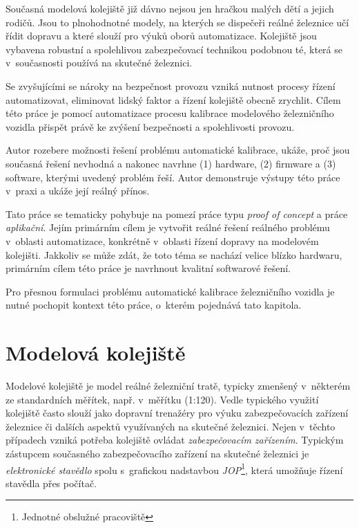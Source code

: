 Současná modelová kolejiště již dávno nejsou jen hračkou malých dětí
a jejich rodičů. Jsou to plnohodnotné modely, na kterých se dispečeři reálné
železnice učí řídit dopravu a které slouží pro výuků oborů automatizace.
Kolejiště jsou vybavena robustní a spolehlivou zabezpečovací technikou
podobnou té, která se v~současnosti používá na skutečné železnici.

Se zvyšujícími se nároky na bezpečnost provozu vzniká nutnost procesy řízení
automatizovat, eliminovat lidský faktor a řízení kolejiště obecně
zrychlit. Cílem této práce je pomocí automatizace procesu kalibrace modelového
železničního vozidla přispět právě ke zvýšení bezpečnosti a spolehlivosti
provozu.

Autor rozebere možnosti řešení problému automatické kalibrace, ukáže, proč jsou
současná řešení nevhodná a nakonec navrhne (1) hardware, (2) firmware a (3)
software, kterými uvedený problém řeší. Autor demonstruje výstupy této práce
v~praxi a ukáže její reálný přínos.

Tato práce se tematicky pohybuje na pomezí práce typu \textit{proof of concept}
a práce \textit{aplikační}. Jejím primárním cílem je vytvořit reálné řešení
reálného problému v~oblasti automatizace, konkrétně v~oblasti řízení dopravy na
modelovém kolejišti. Jakkoliv se může zdát, že toto téma se nachází velice
blízko hardwaru, primárním cílem této práce je navrhnout kvalitní softwarové
řešení.

Pro přesnou formulaci problému automatické kalibrace železničního vozidla je
nutné pochopit kontext této práce, o~kterém pojednává tato kapitola.

\section{Modelová kolejiště}

Modelové kolejiště je model reálné železniční tratě, typicky zmenšený
v~některém ze standardních měřítek, např. v~měřítku  (1:120). Vedle
typického  využití kolejiště často slouží jako dopravní trenažéry pro
výuku zabezpečovacích zařízení železnice či dalších aspektů využívaných na
skutečné železnici. Nejen v~těchto případech vzniká potřeba kolejiště ovládat
\textit{zabezpečovacím zařízením}. Typickým zástupcem současného
zabezpečovacího zařízení na skutečné železnici je \textit{elektronické
stavědlo} spolu s~grafickou nadstavbou \textit{JOP}\footnote{Jednotné obslužné
pracoviště}, která umožňuje řízení stavědla přes počítač.

